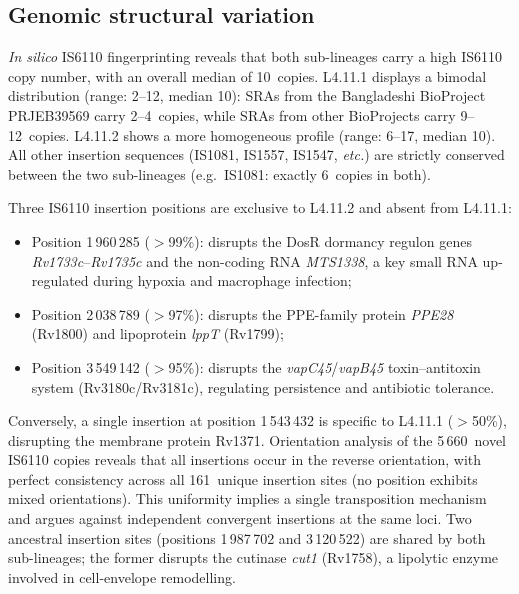\documentclass[11pt,a4paper]{article}
\newcommand{\lignee}[1]{\textsf{#1}}
\begin{document}
\subsection{Genomic structural variation}
\label{sec:structural}

\textit{In silico} IS6110 fingerprinting reveals that both sub-lineages
carry a high IS6110 copy number, with an overall median of 10~copies.
\lignee{L4.11.1} displays a bimodal distribution (range: 2--12, median
10): SRAs from the Bangladeshi BioProject PRJEB39569 carry 2--4~copies,
while SRAs from other BioProjects carry 9--12~copies.
\lignee{L4.11.2} shows a more homogeneous profile (range: 6--17, median
10).  All other insertion sequences (IS1081, IS1557, IS1547,
\textit{etc.}) are strictly conserved between the two sub-lineages
(e.g.\ IS1081: exactly 6~copies in both).

Three IS6110 insertion positions are exclusive to \lignee{L4.11.2} and
absent from \lignee{L4.11.1}:
\begin{sloppypar}
\begin{itemize}
	\item Position 1\,960\,285 ($>$99\%): disrupts the DosR dormancy
	      regulon genes \textit{Rv1733c}--\textit{Rv1735c} and the non-coding RNA
	      \textit{MTS1338}, a key small RNA up-regulated during hypoxia and
	      macrophage infection;
	\item Position 2\,038\,789 ($>$97\%): disrupts the PPE-family
	      protein \textit{PPE28} (Rv1800) and lipoprotein \textit{lppT} (Rv1799);
	\item Position 3\,549\,142 ($>$95\%): disrupts the
	      \textit{vapC45}/\textit{vapB45} toxin--antitoxin system
	      (Rv3180c/Rv3181c), regulating persistence and
	      antibiotic tolerance.
\end{itemize}
\end{sloppypar}
Conversely, a single insertion at position 1\,543\,432 is specific to
\lignee{L4.11.1} ($>$50\%), disrupting the membrane protein Rv1371.
Orientation analysis of the 5\,660~novel IS6110 copies reveals that all
insertions occur in the reverse orientation, with perfect consistency
across all 161~unique insertion sites (no position exhibits mixed
orientations).  This uniformity implies a single transposition mechanism
and argues against independent convergent insertions at the same loci.
Two ancestral insertion sites (positions 1\,987\,702 and 3\,120\,522) are
shared by both sub-lineages; the former disrupts the cutinase \textit{cut1}
(Rv1758), a lipolytic enzyme involved in cell-envelope remodelling.
\end{document}
